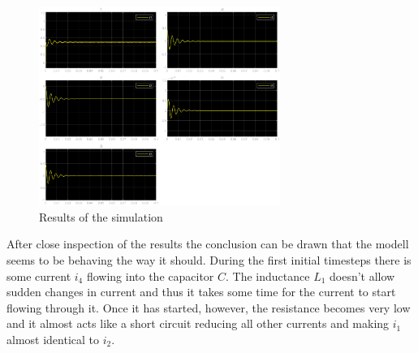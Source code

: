 	\begin{figure}[H]
		\centering
		\includegraphics[width=0.7\textwidth]{figures/results.eps}
		\caption{Results of the simulation}
		\label{fig:results}
	\end{figure}
After close inspection of the results the conclusion can be drawn that the modell seems to be behaving the way it should. During the first initial timesteps there is some current $i_4$ flowing into the capacitor $C$. The inductance $L_1$ doesn't allow sudden changes in current and thus it takes some time for the current to start flowing through it. Once it has started, however, the resistance becomes very low and it almost acts like a short circuit reducing all other currents and making $i_1$ almost identical to $i_2$.
